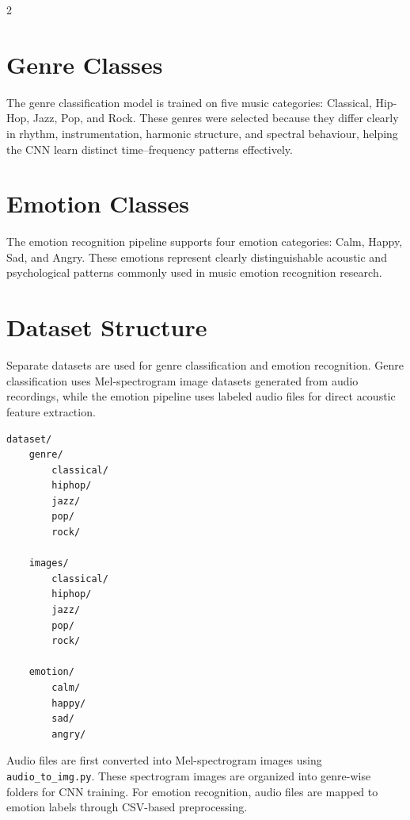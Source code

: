 \documentclass[12pt,a4paper]{report}
\begin{document}
\begin{multicols}{2}

\section*{Genre Classes}

The genre classification model is trained on five music categories: Classical, Hip-Hop, Jazz, Pop, and Rock. These genres were selected because they differ clearly in rhythm, instrumentation, harmonic structure, and spectral behaviour, helping the CNN learn distinct time--frequency patterns effectively.

\columnbreak

\section*{Emotion Classes}

The emotion recognition pipeline supports four emotion categories: Calm, Happy, Sad, and Angry. These emotions represent clearly distinguishable acoustic and psychological patterns commonly used in music emotion recognition research.

\end{multicols}

\section*{Dataset Structure}

Separate datasets are used for genre classification and emotion recognition. Genre classification uses Mel-spectrogram image datasets generated from audio recordings, while the emotion pipeline uses labeled audio files for direct acoustic feature extraction.

\begin{verbatim}
dataset/
    genre/
        classical/
        hiphop/
        jazz/
        pop/
        rock/

    images/
        classical/
        hiphop/
        jazz/
        pop/
        rock/
    
    emotion/
        calm/
        happy/
        sad/
        angry/
\end{verbatim}

Audio files are first converted into Mel-spectrogram images using \texttt{audio\_to\_img.py}. These spectrogram images are organized into genre-wise folders for CNN training. For emotion recognition, audio files are mapped to emotion labels through CSV-based preprocessing.
\end{document}
